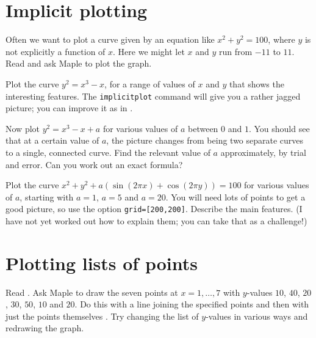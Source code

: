 \documentclass[a4paper,10pt]{amsbook}
\numberwithin{example}{chapter}
\begin{document}
\section{Implicit plotting}


Often we want to plot a curve given by an equation like
$x^2+y^2=100$, where $y$ is not explicitly a function of
$x$.  Here we might let $x$ and $y$ run from $-11$ to $11$.
Read \note{\NOTEimplicitplot} and ask Maple to plot the
graph. 

\begin{exercise}
 Plot the curve $y^2=x^3-x$, for a range of values of $x$
 and $y$ that shows the interesting features.  The
 \verb~implicitplot~ command will give you a rather jagged
 picture; you can improve it as in \note{\NOTEgrid}.

 Now plot $y^2=x^3-x+a$ for various values of $a$ between
 $0$ and $1$.  You should see that at a certain value of
 $a$, the picture changes from being two separate curves to
 a single, connected curve.  Find the relevant value of $a$
 approximately, by trial and error.  Can you work out an
 exact formula? 
\end{exercise}

\begin{exercise}
 Plot the curve $x^2+y^2+a(\sin(2\pi x)+\cos(2\pi y))=100$ for
 various values of $a$, starting with $a=1$, $a=5$ and
 $a=20$.  You will need lots of points to get a good
 picture, so use the option \verb~grid=[200,200]~.  Describe
 the main features.  (I have not yet  worked out how to
 explain them; you can take that as a challenge!) 
\end{exercise}

\section{Plotting lists of points}

\begin{exercise}\label{ex-listplot}
 Read \note{\NOTElistplot\dots\NOTElistplotgen}.  Ask Maple
 to draw the seven points at $x=1,\dotsc,7$ with $y$-values
 $10$, $40$, $20$, $30$, $50$, $10$ and $20$.  Do this with
 a line joining the specified points \note{\NOTElistplot}
 and then with just the points themselves
 \note{\NOTElistplotstyle}.  Try changing the list of
 $y$-values in various ways and redrawing the graph.
\end{exercise}
\end{document}
